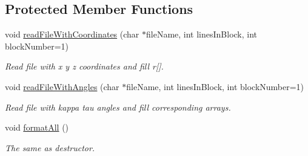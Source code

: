 \subsection*{Protected Member Functions}
\begin{DoxyCompactItemize}
\item 
void \hyperlink{class_p_c_a_1_1_polymer_a777691bb321ef1da30a064757eb480c7}{read\+File\+With\+Coordinates} (char $\ast$file\+Name, int lines\+In\+Block, int block\+Number=1)
\begin{DoxyCompactList}\small\item\em Read file with x y z coordinates and fill r\mbox{[}\mbox{]}. \end{DoxyCompactList}\item 
void \hyperlink{class_p_c_a_1_1_polymer_a3e498b6e57d98c9cc4d07a7aedb4b6a5}{read\+File\+With\+Angles} (char $\ast$file\+Name, int lines\+In\+Block, int block\+Number=1)
\begin{DoxyCompactList}\small\item\em Read file with kappa tau angles and fill corresponding arrays. \end{DoxyCompactList}\item 
void \hyperlink{class_p_c_a_1_1_polymer_a3fcca4084a54ac8bc1941b36462bc560}{format\+All} ()
\begin{DoxyCompactList}\small\item\em The same as destructor. \end{DoxyCompactList}\end{DoxyCompactItemize}
